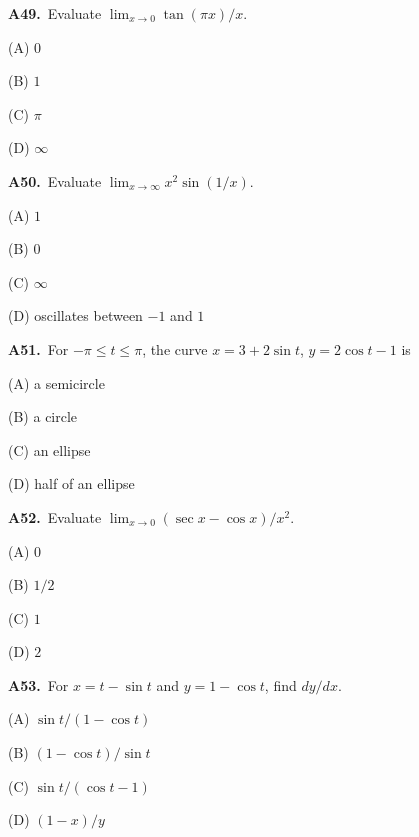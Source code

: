 \documentclass[11pt]{article}
\begin{document}
\bigskip\noindent\textbf{A49.}\ Evaluate $\lim_{x\to0}\tan(\pi x)/x$.
\begin{list}{}{\setlength{\leftmargin}{3em}\setlength{\labelwidth}{2.5em}\setlength{\itemsep}{0pt}\setlength{\topsep}{2pt}}
\item[(A)] $0$
\item[(B)] $1$
\item[(C)] $\pi$
\item[(D)] $\infty$
\end{list}

\bigskip\noindent\textbf{A50.}\ Evaluate $\lim_{x\to\infty}x^2\sin(1/x)$.
\begin{list}{}{\setlength{\leftmargin}{3em}\setlength{\labelwidth}{2.5em}\setlength{\itemsep}{0pt}\setlength{\topsep}{2pt}}
\item[(A)] $1$
\item[(B)] $0$
\item[(C)] $\infty$
\item[(D)] oscillates between $-1$ and $1$
\end{list}

\bigskip\noindent\textbf{A51.}\ For $-\pi\le t\le\pi$, the curve $x=3+2\sin t$, $y=2\cos t-1$ is
\begin{list}{}{\setlength{\leftmargin}{3em}\setlength{\labelwidth}{2.5em}\setlength{\itemsep}{0pt}\setlength{\topsep}{2pt}}
\item[(A)] a semicircle
\item[(B)] a circle
\item[(C)] an ellipse
\item[(D)] half of an ellipse
\end{list}

\bigskip\noindent\textbf{A52.}\ Evaluate $\lim_{x\to0}(\sec x-\cos x)/x^2$.
\begin{list}{}{\setlength{\leftmargin}{3em}\setlength{\labelwidth}{2.5em}\setlength{\itemsep}{0pt}\setlength{\topsep}{2pt}}
\item[(A)] $0$
\item[(B)] $1/2$
\item[(C)] $1$
\item[(D)] $2$
\end{list}

\bigskip\noindent\textbf{A53.}\ For $x=t-\sin t$ and $y=1-\cos t$, find $dy/dx$.
\begin{list}{}{\setlength{\leftmargin}{3em}\setlength{\labelwidth}{2.5em}\setlength{\itemsep}{0pt}\setlength{\topsep}{2pt}}
\item[(A)] $\sin t/(1-\cos t)$
\item[(B)] $(1-\cos t)/\sin t$
\item[(C)] $\sin t/(\cos t-1)$
\item[(D)] $(1-x)/y$
\end{list}
\end{document}
